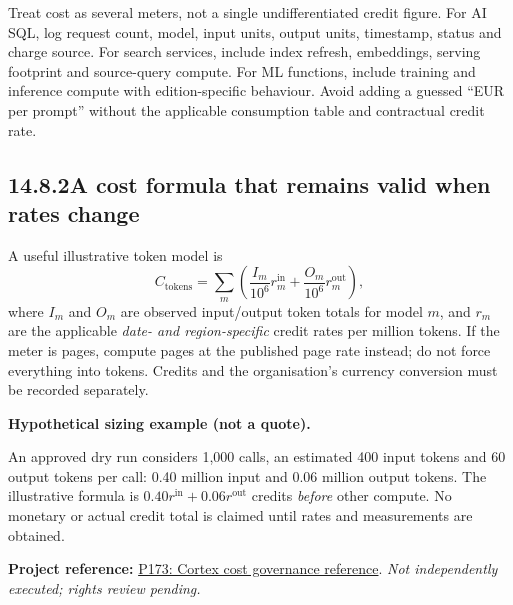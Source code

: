 \documentclass[11pt,twoside]{article}
\newcommand{\topic}[2]{\subsection*{#1\quad #2}}
\newcommand{\repo}[2]{\par\begingroup\fontsize{8.0}{9.6}\selectfont\sffamily\color{inkgray}\textbf{Project reference:} \href{#2}{#1}. \textit{Not independently executed; rights review pending.}\par\endgroup}
\begin{document}
Treat cost as several meters, not a single undifferentiated credit figure. For AI SQL, log request count, model, input units, output units, timestamp, status and charge source. For search services, include index refresh, embeddings, serving footprint and source-query compute. For ML functions, include training and inference compute with edition-specific behaviour. Avoid adding a guessed ``EUR per prompt'' without the applicable consumption table and contractual credit rate.
\topic{14.8.2}{A cost formula that remains valid when rates change}
A useful illustrative token model is
\[
C_{\mathrm{tokens}} = \sum_{m}\left(\frac{I_m}{10^{6}}r^{\mathrm{in}}_m + \frac{O_m}{10^{6}}r^{\mathrm{out}}_m\right),
\]
where $I_m$ and $O_m$ are observed input/output token totals for model $m$, and $r_m$ are the applicable \emph{date- and region-specific} credit rates per million tokens. If the meter is pages, compute pages at the published page rate instead; do not force everything into tokens. Credits and the organisation's currency conversion must be recorded separately.
\begin{whitebox}\textbf{Hypothetical sizing example (not a quote).}\par
An approved dry run considers 1{,}000 calls, an estimated 400 input tokens and 60 output tokens per call: 0.40 million input and 0.06 million output tokens. The illustrative formula is $0.40r^{\mathrm{in}}+0.06r^{\mathrm{out}}$ credits \emph{before} other compute. No monetary or actual credit total is claimed until rates and measurements are obtained.
\end{whitebox}
\repo{P173: Cortex cost governance reference}{https://github.com/sfc-gh-tdahlberg/cortex-cost-governance}

\newpage
\end{document}
